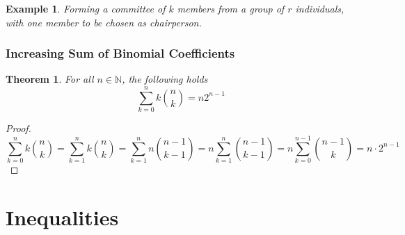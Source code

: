 \documentclass[11pt]{book} %
\newtheorem{theorem}{Theorem}[section]
\newtheorem*{example*}{Example}
\begin{document}
\begin{example*}
    Forming a committee of $k$ members from a group of $r$ individuals, with one member to be chosen as chairperson.
\end{example*}

\subsection{Increasing Sum of Binomial Coefficients}

\begin{boxA}
    \begin{theorem}
        For all $n\in \mathbb{N}$, the following holds
        \begin{equation}
            \sum_{k=0}^{n} k \binom{n}{k} = n 2^{n-1}
        \end{equation}
    \end{theorem}
\end{boxA}

\begin{proof}
    \begin{equation}
        \sum_{k=0}^{n} k \binom{n}{k} = \sum_{k=1}^{n} k \binom{n}{k} = \sum_{k=1}^{n} n \binom{n-1}{k-1} = n \sum_{k=1}^{n} \binom{n-1}{k-1} = n \sum_{k=0}^{n-1} \binom{n-1}{k} = n \cdot 2^{n-1}
    \end{equation}
\end{proof}

\chapter{Inequalities}
\end{document}
